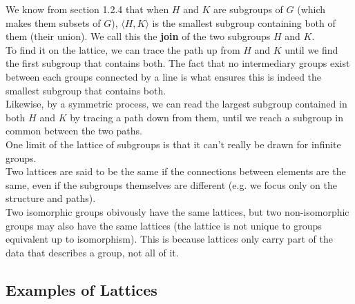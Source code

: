 \documentclass[12pt]{article}
\newcommand{\ang}[1]{\langle #1 \rangle}
\begin{document}
    We know from section 1.2.4 that 
    when $H$ and $K$ are subgroups of $G$
    (which makes them subsets of $G$),
    $\ang{H, K}$
    is the smallest subgroup containing both of them
    (their union).
    We call this the \textbf{join} of the two subgroups $H$ and $K$. \\
    To find it on the lattice,
    we can trace the path up from $H$ and $K$
    until we find the first subgroup that contains both.
    The fact that no intermediary groups exist
    between each groups connected by a line is what ensures
    this is indeed the smallest subgroup that contains both. \\
    Likewise, by a symmetric process,
    we can read the largest subgroup contained in both $H$
    and $K$ by tracing a path down from them,
    until we reach a subgroup in common between the two paths. \\

    One limit of the lattice of subgroups is that it can't
    really be drawn for infinite groups. \\

    Two lattices are said to be the same if the
    connections between elements are the same,
    even if the subgroups themselves are different
    (e.g. we focus only on the structure and paths). \\
    Two isomorphic groups obivously have the same lattices,
    but two non-isomorphic groups may also have the same lattices
    (the lattice is not unique to groups equivalent
    up to isomorphism).
    This is because lattices only carry part of the data
    that describes a group, not all of it. \\

    \subsection*{Examples of Lattices}
\end{document}
